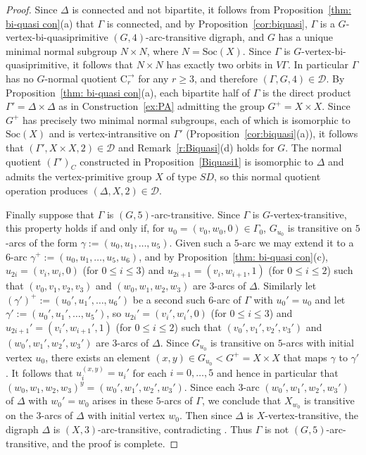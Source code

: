 \documentclass[11pt]{amsart}
\newcommand{\Soc}{\mathrm{Soc}}
\newcommand{\C}{{\mathrm{C}}}
\newcommand\DD{{\mathscr{D}}}
\begin{document}
\begin{proof}
    Since $\Delta$ is connected and not bipartite, it follows from Proposition~\ref{thm: bi-quasi con}(a) that $\Gamma$ is connected, and by Proposition~\ref{cor:biquasi},  $\Gamma$ is a  $G$-vertex-bi-quasiprimitive $(G,4)$-arc-transitive digraph, and $G$ has a unique minimal normal subgroup $N\times N$, where $N=\Soc(X)$. Since $\Gamma$ is $G$-vertex-bi-quasiprimitive, it follows  that $N\times N$ has exactly two orbits in $V\Gamma$.  In particular $\Gamma$ has no $G$-normal quotient $\C_r^\to$ for any $r\geqslant3$, and therefore $(\Gamma, G, 4)\in\DD$. By Proposition~\ref{thm: bi-quasi con}(a), each bipartite half of $\Gamma$ is the direct product  $\Gamma'=\Delta\times\Delta$ as in Construction~\ref{ex:PA} admitting the group $G^+=X\times X$. Since $G^+$ has precisely two minimal normal subgroups, each of which is isomorphic to $\Soc(X)$ and is vertex-intransitive on $\Gamma'$ (Proposition~\ref{cor:biquasi}(a)), it follows that $(\Gamma', X\times X, 2)\in\DD$ and Remark~\ref{r:Biquasi}(d) holds for $G$. The normal quotient $(\Gamma')_C$ constructed in Proposition~\ref{Biquasi1} is isomorphic to $\Delta$ and admits the vertex-primitive group $X$ of type \(SD\), so this normal quotient operation produces $(\Delta, X, 2)\in\DD$.  
    
    Finally suppose that $\Gamma$ is $(G,5)$-arc-transitive. Since $\Gamma$ is $G$-vertex-transitive, this property holds if and only if, for $u_0=(v_0,w_0,0)\in\Gamma_0$, $G_{u_0}$ is transitive on $5$-arcs of the form $\gamma:=(u_0,u_1,\dots, u_5)$. Given such a $5$-arc  we may extend it to a $6$-arc $\gamma^+:=(u_0,u_1,\dots, u_5, u_6)$, and by Proposition~\ref{thm: bi-quasi con}(c),  $u_{2i}=(v_i,w_i,0)$ (for $0\leq i\leq 3$) and $u_{2i+1}=(v_i,w_{i+1},1)$ (for $0\leq i\leq 2$) such that $(v_0,v_1,v_2,v_3)$ and $(w_0,w_1,w_2,w_3)$ are $3$-arcs of $\Delta$.    Similarly let $(\gamma')^+:=(u_0',u_1',\dots, u_6')$ be a second such $6$-arc of $\Gamma$ with $u_0'=u_0$ and let $\gamma':=(u_0',u_1',\dots, u_5')$, so  $u_{2i}'=(v_i',w_i',0)$ (for $0\leq i\leq 3$) and $u_{2i+1}'=(v_i',w_{i+1}',1)$ (for $0\leq i\leq 2$) such that $(v_0',v_1',v_2',v_3')$ and $(w_0',w_1',w_2',w_3')$ are $3$-arcs of $\Delta$. Since $G_{u_0}$ is transitive on $5$-arcs with initial vertex $u_0$, there exists an element $(x,y)\in G_{u_0}<G^+=X\times X$ that maps $\gamma$ to $\gamma'$. It follows that $u_i^{(x,y)}=u_i'$ for each $i=0,\dots,5$ and hence in particular that $(w_0,w_1,w_2,w_3)^y= (w_0',w_1',w_2',w_3')$. Since each $3$-arc $(w_0',w_1',w_2',w_3')$ of $\Delta$ with $w_0'=w_0$ arises in these $5$-arcs of $\Gamma$, we conclude that $X_{w_0}$ is transitive on the $3$-arcs of $\Delta$ with initial vertex $w_0$. Then since $\Delta$ is $X$-vertex-transitive, the digraph $\Delta$ is $(X,3)$-arc-transitive, contradicting \cite[Theorem 1.2]{quasi}. Thus $\Gamma$  is not $(G,5)$-arc-transitive, and the proof is complete.
\end{proof}
\end{document}
